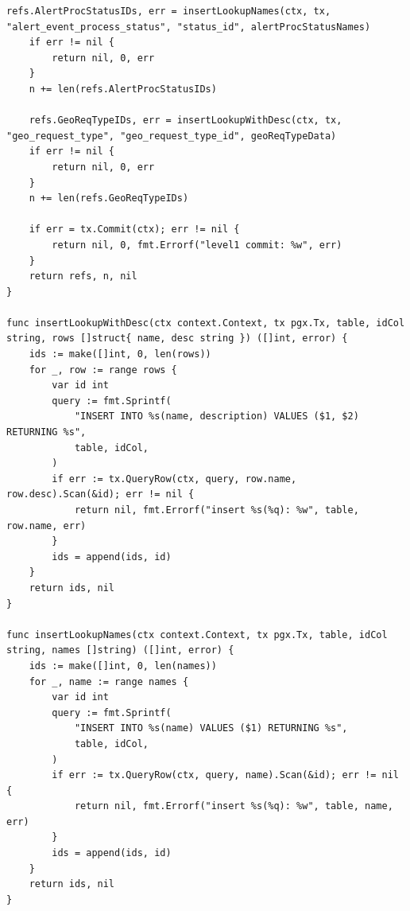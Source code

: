 \begin{lstlisting}[style=gostyle, caption={Заполнение таблиц-справочников (internal/seeder/level1.go)}, label={lst:goLevel1}]
	refs.AlertProcStatusIDs, err = insertLookupNames(ctx, tx, "alert_event_process_status", "status_id", alertProcStatusNames)
	if err != nil {
		return nil, 0, err
	}
	n += len(refs.AlertProcStatusIDs)

	refs.GeoReqTypeIDs, err = insertLookupWithDesc(ctx, tx, "geo_request_type", "geo_request_type_id", geoReqTypeData)
	if err != nil {
		return nil, 0, err
	}
	n += len(refs.GeoReqTypeIDs)

	if err = tx.Commit(ctx); err != nil {
		return nil, 0, fmt.Errorf("level1 commit: %w", err)
	}
	return refs, n, nil
}

func insertLookupWithDesc(ctx context.Context, tx pgx.Tx, table, idCol string, rows []struct{ name, desc string }) ([]int, error) {
	ids := make([]int, 0, len(rows))
	for _, row := range rows {
		var id int
		query := fmt.Sprintf(
			"INSERT INTO %s(name, description) VALUES ($1, $2) RETURNING %s",
			table, idCol,
		)
		if err := tx.QueryRow(ctx, query, row.name, row.desc).Scan(&id); err != nil {
			return nil, fmt.Errorf("insert %s(%q): %w", table, row.name, err)
		}
		ids = append(ids, id)
	}
	return ids, nil
}

func insertLookupNames(ctx context.Context, tx pgx.Tx, table, idCol string, names []string) ([]int, error) {
	ids := make([]int, 0, len(names))
	for _, name := range names {
		var id int
		query := fmt.Sprintf(
			"INSERT INTO %s(name) VALUES ($1) RETURNING %s",
			table, idCol,
		)
		if err := tx.QueryRow(ctx, query, name).Scan(&id); err != nil {
			return nil, fmt.Errorf("insert %s(%q): %w", table, name, err)
		}
		ids = append(ids, id)
	}
	return ids, nil
}
\end{lstlisting}
\newpage

